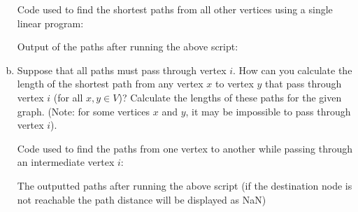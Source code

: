 \documentclass[../report/main.tex]{subfiles}
\begin{document}
\begin{enumerate}[a)]
    Code used to find the shortest paths from all other vertices using a single linear program:

    

    Output of the paths after running the above script:

    

	\item Suppose that all paths must pass through vertex $i$. How can you calculate the length of the shortest path from any vertex $x$ to vertex $y$ that pass through vertex $i$ (for all $x, y \in V$)? Calculate the lengths of these paths for the given graph. (Note: for some vertices $x$ and $y$, it may be impossible to pass through vertex $i$).

    Code used to find the paths from one vertex to another while passing through an intermediate vertex $i$:

    

    The outputted paths after running the above script (if the destination node is not reachable the path distance will be displayed as NaN)

    
\end{enumerate}
\end{document}
